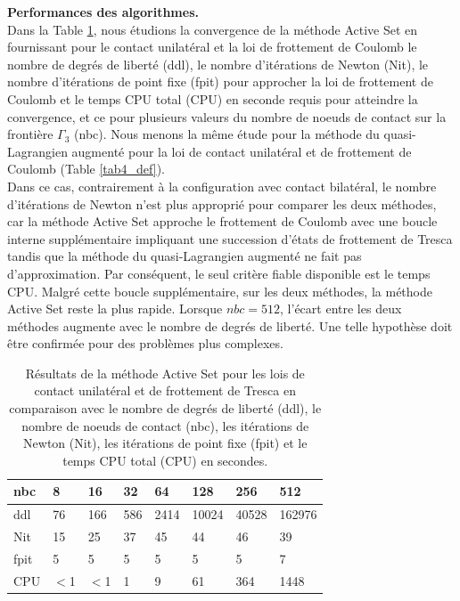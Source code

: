 \noindent\textbf{Performances des algorithmes.}\\
Dans la Table \ref{tab3_def}, nous étudions la convergence de la méthode Active Set en fournissant pour le contact unilatéral et la loi de frottement de Coulomb le nombre de degrés de liberté (ddl), le nombre d'itérations de Newton (Nit), le nombre d'itérations de point fixe (fpit) pour approcher la loi de frottement de Coulomb et le temps CPU total (CPU) en seconde requis pour atteindre la convergence, et ce pour plusieurs valeurs du nombre de noeuds de contact sur la frontière $\Gamma_3$ (nbc). Nous menons la même étude pour la méthode du quasi-Lagrangien augmenté pour la loi de contact unilatéral et de frottement de Coulomb (Table \ref{tab4_def}).\\
Dans ce cas, contrairement à la configuration avec contact bilatéral, le nombre d'itérations de Newton n'est plus approprié pour comparer les deux méthodes, car la méthode Active Set approche le frottement de Coulomb avec une boucle interne supplémentaire impliquant une succession d'états de frottement de Tresca tandis que la méthode du quasi-Lagrangien augmenté ne fait pas d'approximation. Par conséquent, le seul critère fiable disponible est le temps CPU. Malgré cette boucle supplémentaire, sur les deux méthodes, la méthode Active Set reste la plus rapide. Lorsque $ nbc = 512 $, l'écart entre les deux méthodes augmente avec le nombre de degrés de liberté. Une telle hypothèse doit être confirmée pour des problèmes plus complexes.\\
\begin{table}[htbp!]
\begin{tabular}{ |p{1.25cm}|p{1.25cm}|p{1.25cm}|p{1.25cm}|p{1.25cm}|p{1.25cm}|p{1.25cm}|p{1.25cm}| }
 \hline \rowcolor{lightgray}
			nbc & 8 & 16 & 32 & 64 & 128 & 256 & 512 \\
			\hline
			ddl & 76 & 166 & 586 & 2414 & 10024 & 40528 & 162976 \\
			Nit &  15 & 25 & 37 & 45 & 44 & 46 & 39 \\
            fpit &  5 & 5 & 5 & 5 & 5 & 5 & 7 \\
			CPU &  $<$1 & $<$1 & 1 & 9 & 61 & 364 & 1448  \\
\hline
\end{tabular}
\caption{Résultats de la méthode Active Set pour les lois de contact unilatéral et de               frottement de Tresca %
		   en comparaison avec le nombre de degrés de liberté (ddl), le nombre de noeuds de contact (nbc), les itérations de Newton (Nit), les itérations de point fixe (fpit) et le temps CPU total (CPU) en secondes.}\label{tab3_def}
\end{table}

